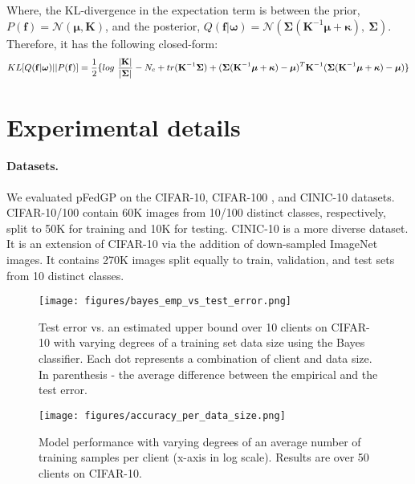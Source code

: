 \documentclass{article}
\newcommand{\normal}{\mathcal{N}}
\newcommand{\bld}[1]{\boldsymbol{#1}}
\def\rvf{{\mathbf{f}}}
\def\rmK{{\mathbf{K}}}
\newcommand{\KL}{KL}
\newcommand{\rvmu}{\bld{\mathbf{\mu}}}
\newcommand{\rvomega}{\bld{\mathbf{\omega}}}
\newcommand{\rvkappa}{\bld{\mathbf{\kappa}}}
\newcommand{\rmSigma}{\mathbf{\Sigma}}
\newcommand{\rmKInv}{\mathbf{K}^{-1}}
\begin{document}
Where, the KL-divergence in the expectation term is between the prior, $P(\rvf) = \normal(\rvmu, \rmK)$, and the posterior, $Q(\rvf | \rvomega) = \normal(\rmSigma(\rmKInv\rvmu + \rvkappa),~\rmSigma)$. Therefore, it has the following closed-form:
\begin{equation} \label{eq:kl_gaussians}
    \small
    \begin{aligned}
    \KL[Q(\rvf | \rvomega) || P(\rvf)] = \frac{1}{2}\{log~\frac{|\rmK|}{|\rmSigma|} - N_c + tr(\rmKInv\rmSigma) + (\rmSigma(\rmKInv\rvmu + \rvkappa) - \rvmu)^T \rmKInv (\rmSigma(\rmKInv\rvmu + \rvkappa) - \rvmu)\}
    \end{aligned}
\end{equation}





\section{Experimental details} \label{sec:exp_details}


\paragraph{Datasets.} We evaluated pFedGP on the CIFAR-10, CIFAR-100 \cite{krizhevsky2009learning}, and CINIC-10 \cite{darlow2018cinic} datasets. CIFAR-10/100 contain 60K images from 10/100 distinct classes, respectively, split to 50K for training and 10K for testing. CINIC-10 is a more diverse dataset. It is an extension of CIFAR-10 via the addition of down-sampled ImageNet \cite{deng2009imagenet} images. It contains 270K images split equally to train, validation, and test sets from 10 distinct classes.
\begin{figure}[!t]
    \centering
    \begin{minipage}{.45\textwidth}
        \centering
        \texttt{[image: figures/bayes\_emp\_vs\_test\_error.png]}
        \caption{Test error vs. an estimated upper bound over 10 clients on CIFAR-10 with varying degrees of a training set data size using the Bayes classifier. Each dot represents a combination of client and data size. In parenthesis - the average difference between the empirical and the test error.}
        \label{fig:gen_vs_test_error_bayes}
    \end{minipage}\hskip 1.0cm
    \begin{minipage}{0.45\textwidth}
        \vspace{-25pt}
        \centering
        \texttt{[image: figures/accuracy\_per\_data\_size.png]}
        \caption{Model performance with varying degrees of an average number of training samples per client (x-axis in log scale). Results are over 50 clients on CIFAR-10.}
        \label{fig:varying}
    \end{minipage}
\end{figure}
\end{document}
